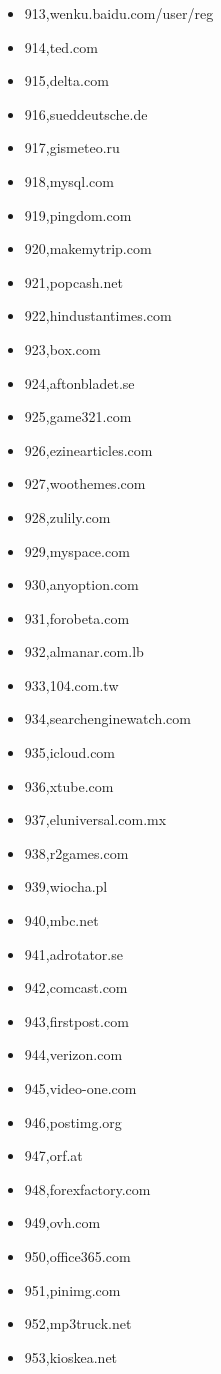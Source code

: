 \begin{multicols}{3}
\begin{itemize}
	\item 913,wenku.baidu.com/user/reg
	\item 914,ted.com
	\item 915,delta.com
	\item 916,sueddeutsche.de
	\item 917,gismeteo.ru
	\item 918,mysql.com
	\item 919,pingdom.com
	\item 920,makemytrip.com
	\item 921,popcash.net
	\item 922,hindustantimes.com
	\item 923,box.com
	\item 924,aftonbladet.se
	\item 925,game321.com
	\item 926,ezinearticles.com
	\item 927,woothemes.com
	\item 928,zulily.com
	\item 929,myspace.com
	\item 930,anyoption.com
	\item 931,forobeta.com
	\item 932,almanar.com.lb
	\item 933,104.com.tw
	\item 934,searchenginewatch.com
	\item 935,icloud.com
	\item 936,xtube.com
	\item 937,eluniversal.com.mx
	\item 938,r2games.com
	\item 939,wiocha.pl
	\item 940,mbc.net
	\item 941,adrotator.se
	\item 942,comcast.com
	\item 943,firstpost.com
	\item 944,verizon.com
	\item 945,video-one.com
	\item 946,postimg.org
	\item 947,orf.at
	\item 948,forexfactory.com
	\item 949,ovh.com
	\item 950,office365.com
	\item 951,pinimg.com
	\item 952,mp3truck.net
	\item 953,kioskea.net

\end{itemize}
\end{multicols}
